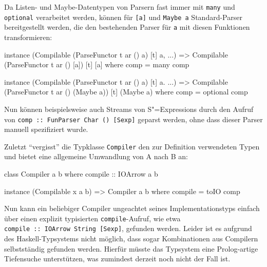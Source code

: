 \documentclass[11pt, a4paper, bibgerm]{scrbook}
\newcommand\icode[1]{\lstinline?#1?}
\newcommand{\sexps}{S"=Expressions}
\begin{document}
Da Listen- und Maybe-Datentypen von Parsern fast immer mit \icode{many}
und \icode{optional} verarbeitet werden, können für \icode{[a]} und
\icode{Maybe a} Standard-Parser bereitgestellt werden, die den
bestehenden Parser für \icode{a} mit diesen Funktionen transformieren:
\begin{code}
instance (Compilable (ParseFunctor t ar () a) [t] a, ...) =>
  Compilable (ParseFunctor t ar () [a]) [t] [a] where
    comp = many comp

instance (Compilable (ParseFunctor t ar () a) [t] a. ...) =>
  Compilable (ParseFunctor t ar () (Maybe a)) [t] (Maybe a) where
    comp = optional comp
\end{code}
Nun können beispielsweise auch Streams von \sexps{} durch den Aufruf von
\icode{comp :: FunParser Char () [Sexp]} geparst werden, ohne dass dieser
  Parser manuell spezifiziert wurde.

Zuletzt "`vergisst"' die Typklasse \icode{Compiler} den zur Definition
verwendeten Typen und bietet eine allgemeine Umwandlung von A nach B an:
\begin{code}
class Compiler a b where
  compile :: IOArrow a b

instance (Compilable x a b) => Compiler a b where
  compile = toIO comp
\end{code}
Nun kann ein beliebiger Compiler ungeachtet seines Implementationstyps
einfach über einen explizit typisierten \icode{compile}-Aufruf, wie etwa
\\\icode{compile :: IOArrow String [Sexp]}, gefunden werden. Leider ist
es aufgrund des Haskell-Typsystems nicht möglich, dass sogar
Kombinationen aus Compilern selbstständig gefunden werden. Hierfür
müsste das Typsystem eine Prolog-artige Tiefensuche unterstützen, was
zumindest derzeit noch nicht der Fall ist. 
\end{document}
